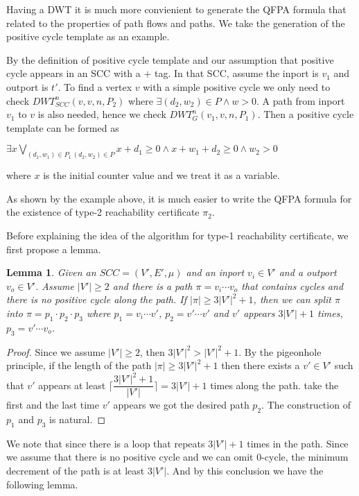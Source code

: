 \documentclass{article}
\newtheorem{lemma}{Lemma}
\newtheorem{proof}{\textit{Proof}}
\begin{document}
\begin{itemize}
Having a DWT it is much more convienient to generate the QFPA formula that related to the properties of path flows and paths. We take the generation of the positive cycle template as an example. 

By the definition of positive cycle template and our assumption that positive cycle appears in an SCC with a $+$ tag. In that SCC, assume the inport is $v_1$ and outport is $t'$. To find a vertex $v$ with a simple positive cycle we only need to check $DWT_{SCC}^n(v,v,n,P_2)$ where $\exists (d_2,w_2)\in P \wedge w > 0 $. A path from inport $v_1$ to $v$ is also needed, hence we check $DWT_G^n(v_1, v, n, P_1)$. Then a positive cycle template can be formed as 
\begin{center}
$\exists x\bigvee_{(d_1,w_1)\in P_1\, (d_2,w_2)\in P} x+d_1 \ge 0 \wedge x+w_1+d_2 \ge 0 \wedge w_2>0$
\end{center}

where $x$ is the initial counter value and we treat it as a variable.

As shown by the example above, it is much easier to write the QFPA formula for the existence of type-2 reachability certificate $\pi_2$.

Before explaining the idea of the algorithm for type-1 reachability certificate, we first propose a lemma.
\begin{lemma}
Given an $SCC = (V', E', \mu)$ and an inport $v_i\in V'$ and a outport $v_o \in V'$. Assume $|V'| \ge 2$ and there is a path $\pi = v_i\cdots v_o$ that contains cycles and there is no positive cycle along the path. If $|\pi| \ge 3|V'|^2 + 1$, then we can split $\pi$ into $\pi = p_1\cdot p_2 \cdot p_3$ where $p_1 = v_i\cdots v'$, $p_2 = v'\cdots v'$ and $v'$ appears $3|V'|+1$ times, $p_3 = v'\cdots v_o$.

\end{lemma}


\begin{proof}
Since we assume $|V'| \ge 2$, then $3|V'|^2 > |V'|^2+1$. By the pigeonhole principle, if the length of the path $|\pi| 
\ge 3|V'|^2 + 1 $ then there exists a $v'\in V'$ such that $v'$ appears at least $\lceil\dfrac{3|V'|^2 + 1}{|V'|}\rceil = 3|V'| + 1 $ times along the path. take the first and the last time $v'$ appears we got the desired path $p_2$. The construction of $p_1$ and $p_3$ is natural.
\end{proof}


We note that since there is a loop that repeats $3|V'| + 1$ times in the path. Since we assume that there is no positive cycle and we can omit 0-cycle, the minimum decrement of the path is at least $3|V'|$. And by this conclusion we have the following lemma.


\end{itemize}
\end{document}
